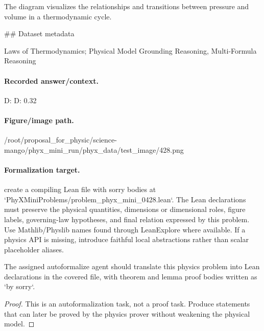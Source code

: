 The diagram visualizes the relationships and transitions between pressure and volume in a thermodynamic cycle.

\#\# Dataset metadata

Laws of Thermodynamics; Physical Model Grounding Reasoning, Multi-Formula Reasoning

\paragraph{Recorded answer/context.}
D: D: 0.32

\paragraph{Figure/image path.}
/root/proposal\_for\_physic/science-mango/phyx\_mini\_run/phyx\_data/test\_image/428.png

\paragraph{Formalization target.}
create a compiling Lean file with sorry bodies at `PhyXMiniProblems/problem\_phyx\_mini\_0428.lean`. The Lean declarations must preserve the physical quantities, dimensions or dimensional roles, figure labels, governing-law hypotheses, and final relation expressed by this problem.
Use Mathlib/Physlib names found through LeanExplore where available. If a physics API is missing, introduce faithful local abstractions rather than scalar placeholder aliases.

\begin{theorem}
\label{thm:physics:phyx_mini_0428:target}
The assigned autoformalize agent should translate this physics problem into Lean declarations in the covered file, with theorem and lemma proof bodies written as `by sorry`.
\end{theorem}
\begin{proof}
This is an autoformalization task, not a proof task. Produce statements that can later be proved by the physics prover without weakening the physical model.
\end{proof}

